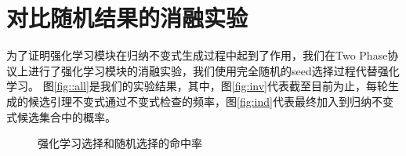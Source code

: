 \section{对比随机结果的消融实验}
为了证明强化学习模块在归纳不变式生成过程中起到了作用，我们在Two Phase协议上进行了强化学习模块的消融实验，我们使用完全随机的seed选择过程代替强化学习。
图\ref{fig::all}是我们的实验结果，其中，图\ref{fig:inv}代表截至目前为止，每轮生成的候选引理不变式通过不变式检查的频率，图\ref{fig:ind}代表最终加入到归纳不变式候选集合中的概率。
\begin{figure}[htb]
    \centering
    \hfill
    \hfill
    \caption{强化学习选择和随机选择的命中率}
    \label{fig:all}
\end{figure}
